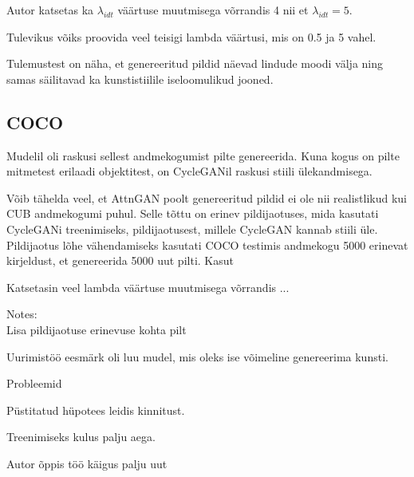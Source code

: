 \documentclass{vilgym}
\begin{document}
	Autor katsetas ka $ \lambda_{idt} $ väärtuse muutmisega võrrandis 4 nii et $ \lambda_{idt} = 5 $.

	Tulevikus võiks proovida veel teisigi lambda väärtusi, mis on 0.5 ja 5 vahel.


	Tulemustest on näha, et genereeritud pildid näevad lindude moodi välja ning samas säilitavad ka kunstistiilile iseloomulikud jooned.

	\subsection{COCO}
	Mudelil oli raskusi sellest andmekogumist pilte genereerida. Kuna kogus on pilte mitmetest erilaadi objektitest, on CycleGANil raskusi stiili ülekandmisega.

	Võib tähelda veel, et AttnGAN poolt genereeritud pildid ei ole nii realistlikud kui CUB andmekogumi puhul. Selle tõttu on erinev pildijaotuses, mida kasutati CycleGANi treenimiseks, pildijaotusest, millele CycleGAN kannab stiili üle. Pildijaotus lõhe vähendamiseks kasutati COCO testimis andmekogu 5000 erinevat kirjeldust, et genereerida 5000 uut pilti. Kasut

	Katsetasin veel lambda väärtuse muutmisega võrrandis ...

	Notes: \\
	Lisa pildijaotuse erinevuse kohta pilt

	Uurimistöö eesmärk oli luu mudel, mis oleks ise võimeline genereerima kunsti. 

	Probleemid

	Püstitatud hüpotees leidis kinnitust.

	Treenimiseks kulus palju aega.

	Autor õppis töö käigus palju uut


	\nocite{*} %
	\printbibliography[title={Kasutatud allikad}]
\end{document}
